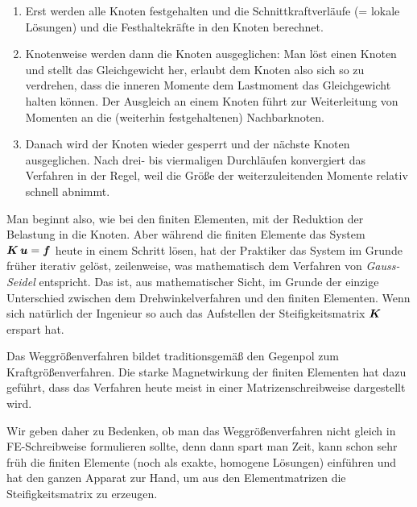 {{\begin{enumerate}
  \item Erst werden alle Knoten festgehalten und die Schnittkraftverl\"{a}ufe (= lokale L\"{o}sungen) und die Festhaltekr\"{a}fte in den Knoten berechnet.
  \item Knotenweise werden dann die Knoten ausgeglichen: Man l\"{o}st einen Knoten und stellt das Gleichgewicht her, erlaubt dem Knoten also sich so zu verdrehen, dass die inneren Momente dem Lastmoment das Gleichgewicht halten k\"{o}nnen. Der Ausgleich an einem Knoten f\"{u}hrt zur Weiterleitung von Momenten an die (weiterhin festgehaltenen) Nachbarknoten.
  \item Danach wird der Knoten wieder gesperrt und der n\"{a}chste Knoten ausgeglichen. Nach drei- bis viermaligen Durchl\"{a}ufen konvergiert das Verfahren in der Regel, weil die Gr\"{o}{\ss}e der weiterzuleitenden Momente relativ schnell abnimmt.
\end{enumerate}

Man beginnt also, wie bei den finiten Elementen, mit der Reduktion der Belastung in die Knoten. Aber w\"{a}hrend die finiten Elemente das System $\mbox{\boldmath $K$}\,\mbox{\boldmath $u$} = \mbox{\boldmath $f$}$ heute in einem Schritt l\"{o}sen, hat der Praktiker das System im Grunde fr\"{u}her iterativ gel\"{o}st, zeilenweise, was mathematisch dem Verfahren von {\em Gauss-Seidel\/} entspricht. Das ist, aus mathematischer Sicht, im Grunde der einzige Unterschied zwischen dem Drehwinkelverfahren und den finiten Elementen. Wenn sich nat\"{u}rlich der Ingenieur so auch das Aufstellen der Steifigkeitsmatrix $\mbox{\boldmath $K$}$ erspart hat.

\begin{remark}
Das Weggr\"{o}{\ss}enverfahren bildet traditionsgem\"{a}{\ss} den Gegenpol zum Kraftgr\"{o}{\ss}enverfahren. Die starke \glq Magnetwirkung\grq{} der finiten Elementen hat dazu gef\"{u}hrt, dass das Verfahren heute meist in einer Matrizenschreibweise dargestellt wird.

Wir geben daher zu Bedenken, ob man das Weggr\"{o}{\ss}enverfahren nicht gleich in FE-Schreibweise formulieren sollte, denn dann spart man Zeit, kann schon sehr fr\"{u}h die finiten Elemente (noch als exakte, homogene L\"{o}sungen) einf\"{u}hren und hat den ganzen Apparat zur Hand, um aus den Elementmatrizen die Steifigkeitsmatrix zu erzeugen.


\end{remark}}}
